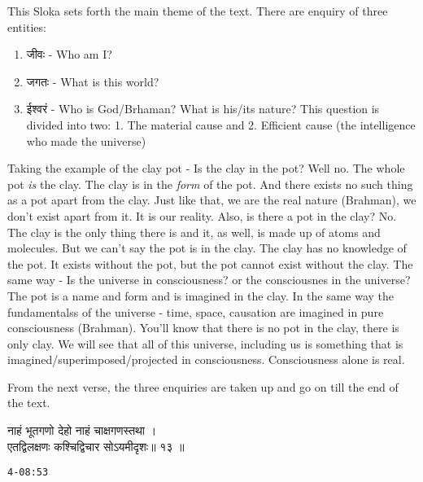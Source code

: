 \documentclass{article}
\begin{document}
\begin{oframed}
This Sloka sets forth the main theme of the text.
There are enquiry of three entities:
\begin{enumerate}
    \item{
            \texthindi{जीवः}
            - Who am I?
        }
    \item{
            \texthindi{जगतः}
            - What is this world?
        }
    \item{
            \texthindi{ईश्वरं}
            - Who is God/Brhaman? What is his/its nature?
            This question is divided into two: 1. The material cause and
            2. Efficient cause (the intelligence who made the universe)

        }
\end{enumerate}


Taking the example of the clay pot - Is the clay in the pot? Well no. The whole
pot \textit{is} the clay. The clay is in the \textit{form} of the pot.  And
there exists no such thing as a pot apart from the clay. Just like that, we
are the real nature (Brahman), we don't exist apart from it. It is our
reality. Also, is there a pot in the clay? No. The clay is the only thing
there is and it, as well, is made up of atoms and molecules. But we can't say
the pot is in the clay. The clay has no knowledge of the pot. It exists
without the pot, but the pot cannot exist without the clay. The same way -
Is the universe in consciousness? or the consciousnes in the universe? The
pot is a name and form and is imagined in the clay. In the same way the
fundamentalss of the universe - time, space, causation are imagined in pure
consciousness (Brahman). You'll know that there is no pot in the clay,
there is only clay. We will see that all of this universe, including us is
something that is imagined/superimposed/projected in consciousness.
Consciousness alone is real.

From the next verse, the three enquiries are taken up and go on till the end of
    the text.

\end{oframed}

\bigskip

\begin{large}
\begin{center}
    \begin{hindi}

    नाहं भूतगणो देहो नाहं चाक्षगणस्तथा ।\\
    एतद्विलक्षणः कश्चिद्विचार सोऽयमीदृशः॥ १३ ॥

    \end{hindi}
\end{center}
\end{large}
\texttt{4-08:53}
\end{document}
